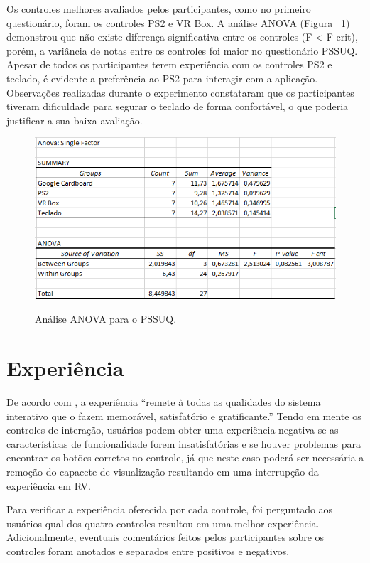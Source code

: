 Os controles melhores avaliados pelos participantes, como no primeiro questionário, foram os controles PS2 e VR Box. A análise ANOVA (Figura ~\ref{f.anovapssuq}) demonstrou que não existe diferença significativa entre os controles (F < F-crit), porém, a variância de notas entre os controles foi maior no questionário PSSUQ. Apesar de todos os participantes terem experiência com os controles PS2 e teclado, é evidente a preferência ao PS2 para interagir com a aplicação. Observações realizadas durante o experimento constataram que os participantes tiveram dificuldade para segurar o teclado de forma confortável, o que poderia justificar a sua baixa avaliação. 

\begin{figure}[H]
	\caption{\small Análise ANOVA para o PSSUQ.}
	\centering
	\includegraphics[scale=0.7]{Imagens/anovapssuq.png}
	\label{f.anovapssuq}
\end{figure}

\section{Experiência}
\label{experiencia}

De acordo com , a experiência “remete à todas as qualidades do sistema interativo que o fazem memorável, satisfatório e gratificante.” Tendo em mente os controles de interação, usuários podem obter uma experiência negativa se as características de funcionalidade forem insatisfatórias e se houver problemas para encontrar os botões corretos no controle, já que neste caso poderá ser necessária a remoção do capacete de visualização resultando em uma interrupção da experiência em RV. 

Para verificar a experiência oferecida por cada controle, foi perguntado aos usuários qual dos quatro controles resultou em uma melhor experiência. Adicionalmente, eventuais comentários feitos pelos participantes sobre os controles foram anotados e separados entre positivos e negativos. 

